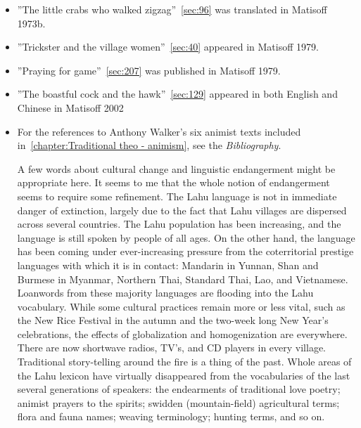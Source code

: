 \begin{itemize}
\item ''The little crabs who walked zigzag''~\ref{sec:96} was
  translated in Matisoff 1973b.

\item ''Trickster and the village women''~\ref{sec:40} appeared in
  Matisoff 1979.

\item ''Praying for game''~\ref{sec:207} was published in Matisoff
  1979.

\item ''The boastful cock and the hawk''~\ref{sec:129} appeared in
  both English and Chinese in Matisoff 2002

\item For the references to Anthony Walker's six animist texts
  included in~\ref{chapter:Traditional theo - animism}, see the
  \emph{Bibliography}.

A few words about cultural change and linguistic endangerment might be
appropriate here. It seems to me that the whole notion of endangerment
seems to require some refinement. The Lahu language is not in immediate
danger of extinction, largely due to the fact that Lahu villages are
dispersed across several countries. The Lahu population has been
increasing, and the language is still spoken by people of all ages. On
the other hand, the language has been coming under ever-increasing
pressure from the coterritorial prestige languages with which it is in
contact: Mandarin in Yunnan, Shan and Burmese in Myanmar, Northern Thai,
Standard Thai, Lao, and Vietnamese. Loanwords from these majority
languages are flooding into the Lahu vocabulary. While some cultural
practices remain more or less vital, such as the New Rice Festival in
the autumn and the two-week long New Year's celebrations, the effects of
globalization and homogenization are everywhere. There are now shortwave
radios, TV's, and CD players in every village. Traditional story-telling
around the fire is a thing of the past. Whole areas of the Lahu lexicon
have virtually disappeared from the vocabularies of the last several
generations of speakers: the endearments of traditional love poetry;
animist prayers to the spirits; swidden (mountain-field) agricultural
terms; flora and fauna names; weaving terminology; hunting terms, and so
on.


\end{itemize}
